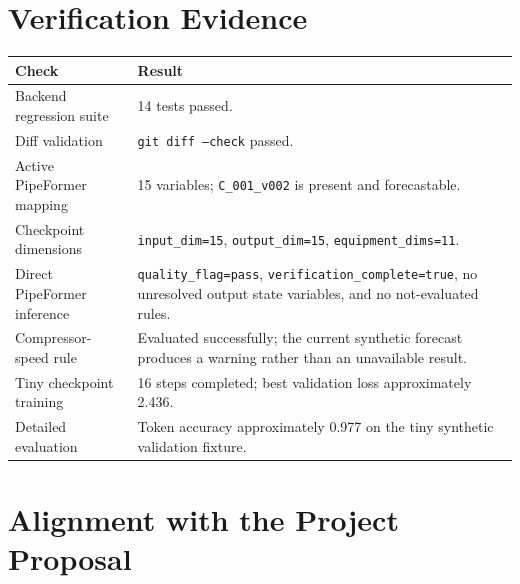 \documentclass[11pt,a4paper]{article}
\newcommand{\code}[1]{\texttt{#1}}
\begin{document}
\section{Verification Evidence}

\begin{table}[htbp]
\centering
\begin{tabularx}{\textwidth}{lX}
\toprule
\textbf{Check} & \textbf{Result} \\
\midrule
Backend regression suite & 14 tests passed. \\
Diff validation & \code{git diff --check} passed. \\
Active PipeFormer mapping & 15 variables; \code{C\_001\_v002} is present and forecastable. \\
Checkpoint dimensions & \code{input\_dim=15}, \code{output\_dim=15}, \code{equipment\_dims=11}. \\
Direct PipeFormer inference & \code{quality\_flag=pass}, \code{verification\_complete=true}, no unresolved output state variables, and no not-evaluated rules. \\
Compressor-speed rule & Evaluated successfully; the current synthetic forecast produces a warning rather than an unavailable result. \\
Tiny checkpoint training & 16 steps completed; best validation loss approximately 2.436. \\
Detailed evaluation & Token accuracy approximately 0.977 on the tiny synthetic validation fixture. \\
\bottomrule
\end{tabularx}
\end{table}

\section{Alignment with the Project Proposal}
\end{document}
